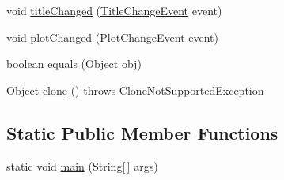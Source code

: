 \begin{DoxyCompactItemize}
\item 
void \mbox{\hyperlink{classorg_1_1jfree_1_1chart_1_1_j_free_chart_aff951e786b0f0e11bbe4842f27ddffc9}{title\+Changed}} (\mbox{\hyperlink{classorg_1_1jfree_1_1chart_1_1event_1_1_title_change_event}{Title\+Change\+Event}} event)
\item 
void \mbox{\hyperlink{classorg_1_1jfree_1_1chart_1_1_j_free_chart_a179c3ec3d9623b1534f1f6ec466c64ed}{plot\+Changed}} (\mbox{\hyperlink{classorg_1_1jfree_1_1chart_1_1event_1_1_plot_change_event}{Plot\+Change\+Event}} event)
\item 
boolean \mbox{\hyperlink{classorg_1_1jfree_1_1chart_1_1_j_free_chart_ab532e84884fe442231e87a391a77ab76}{equals}} (Object obj)
\item 
Object \mbox{\hyperlink{classorg_1_1jfree_1_1chart_1_1_j_free_chart_ae4727c826e3be11540387a1ae67e2aef}{clone}} ()  throws Clone\+Not\+Supported\+Exception 
\end{DoxyCompactItemize}
\subsection*{Static Public Member Functions}
\begin{DoxyCompactItemize}
\item 
static void \mbox{\hyperlink{classorg_1_1jfree_1_1chart_1_1_j_free_chart_ac46407da050d903d0d03ba9f9137623d}{main}} (String\mbox{[}$\,$\mbox{]} args)
\end{DoxyCompactItemize}
